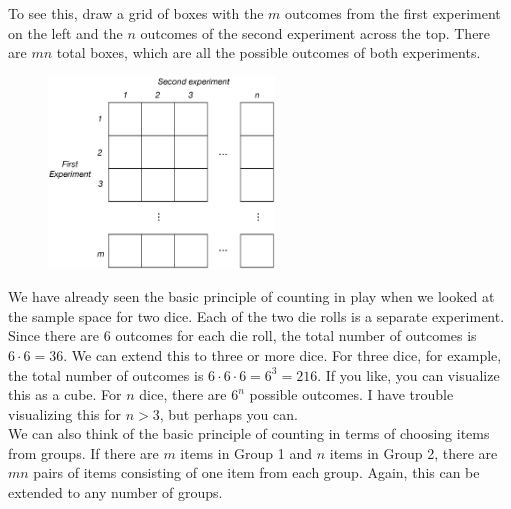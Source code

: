 \documentclass[12pt]{article}
\theoremstyle{definition}
\theoremstyle{remark}
\begin{document}
To see this, draw a grid of boxes with the $m$ outcomes from the first experiment on the left and the $n$ outcomes of the second experiment across the top. There are $mn$ total boxes, which are all the possible outcomes of both experiments.

\begin{figure}[H]
\centering
\includegraphics[width=6cm]{mnrule.eps}
\end{figure}

We have already seen the basic principle of counting in play when we looked at the sample space for two dice. Each of the two die rolls is a separate experiment. Since there are 6 outcomes for each die roll, the total number of outcomes is $6 \cdot 6 = 36$. We can extend this to three or more dice. For three dice, for example, the total number of outcomes is $6 \cdot 6 \cdot 6 = 6^3 = 216$. If you like, you can visualize this as a cube. For $n$ dice, there are $6^n$ possible outcomes. I have trouble visualizing this for $n > 3$, but perhaps you can.\\

We can also think of the basic principle of counting in terms of choosing items from groups. If there are $m$ items in Group 1 and $n$ items in Group 2, there are $mn$ pairs of items consisting of one item from each group. Again, this can be extended to any number of groups.\\
\end{document}
